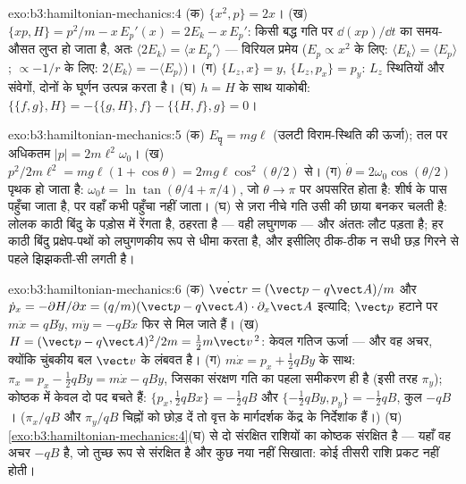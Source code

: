\begin{solution}{exo:b3:hamiltonian-mechanics:4}
(क) $\{x^2, p\} = 2x$। (ख) $\{xp, H\} = p^2/m - x\,E_p'(x) = 2E_k -
x\,E_p'$: किसी बद्ध गति पर $\dd(xp)/\dd t$ का समय-औसत
लुप्त हो जाता है, अतः $\langle 2E_k\rangle = \langle x\,E_p'\rangle$ ---
विरियल प्रमेय ($E_p \propto x^2$ के लिए: $\langle E_k\rangle = \langle
E_p\rangle$; $\propto -1/r$ के लिए: $2\langle E_k\rangle = -\langle
E_p\rangle$)। (ग) $\{L_z, x\} = y$, $\{L_z, p_x\} = p_y$: $L_z$
स्थितियों और संवेगों, दोनों के घूर्णन उत्पन्न करता है। (घ) $h
= H$ के साथ याकोबी: $\{\{f, g\}, H\} = -\{\{g, H\}, f\} - \{\{H, f\}, g\} = 0$।
\end{solution}

\begin{solution}{exo:b3:hamiltonian-mechanics:5}
(क) $E_{\text{पृ}} = mg\ell$ (उलटी विराम-स्थिति की
ऊर्जा); तल पर अधिकतम $|p| = 2m\ell^2\omega_0$। (ख)
$p^2/2m\ell^2 = mg\ell(1 + \cos\theta) = 2mg\ell\cos^2(\theta/2)$ से। (ग)
$\dot\theta = 2\omega_0\cos(\theta/2)$ पृथक हो जाता है: $\omega_0t =
\ln\tan(\theta/4 + \pi/4)$, जो $\theta \to \pi$ पर अपसरित होता है:
शीर्ष के पास पहुँचा जाता है, पर वहाँ कभी पहुँचा नहीं जाता। (घ)
 से ज़रा नीचे गति उसी की छाया बनकर चलती है: लोलक काठी
बिंदु के पड़ोस में रेंगता है, ठहरता है --- वही लघुगणक --- और अंततः
लौट पड़ता है; हर काठी बिंदु प्रक्षेप-पथों को लघुगणकीय रूप से धीमा करता
है, और इसीलिए ठीक-ठीक न सधी छड़ गिरने से पहले झिझकती-सी लगती है।
\end{solution}

\begin{solution}{exo:b3:hamiltonian-mechanics:6}
(क) $\dot{\vect r} = (\vect p - q\vect A)/m$ और $\dot p_x =
-\partial H/\partial x = (q/m)(\vect p - q\vect A)\cdot\partial_x\vect
A$ इत्यादि; $\vect p$ हटाने पर $m\ddot x = qB\dot y$,
$m\ddot y = -qB\dot x$ फिर से मिल जाते हैं। (ख) $H = (\vect p - q\vect A)^2/2m = \tfrac12
m\vect v^{\,2}$: केवल गतिज ऊर्जा --- और वह अचर, क्योंकि चुंबकीय
बल $\vect v$ के लंबवत है। (ग) $m\dot x = p_x +
\tfrac12 qBy$ के साथ: $\pi_x = p_x - \tfrac12 qBy = m\dot x - qBy$, जिसका
संरक्षण गति का पहला समीकरण ही है (इसी तरह $\pi_y$);
कोष्ठक में केवल दो पद बचते हैं: $\{p_x, \tfrac12 qBx\} = -\tfrac12
qB$ और $\{-\tfrac12 qBy, p_y\} = -\tfrac12 qB$, कुल $-qB$। ($\pi_x/qB$ और $\pi_y/qB$
चिह्नों को छोड़ दें तो वृत्त के मार्गदर्शक केंद्र के निर्देशांक
हैं।) (घ) \cref{exo:b3:hamiltonian-mechanics:4}(घ) से दो संरक्षित
राशियों का कोष्ठक संरक्षित है --- यहाँ वह अचर
$-qB$ है, जो तुच्छ रूप से संरक्षित है और कुछ नया नहीं सिखाता: कोई तीसरी
राशि प्रकट नहीं होती।
\end{solution}

